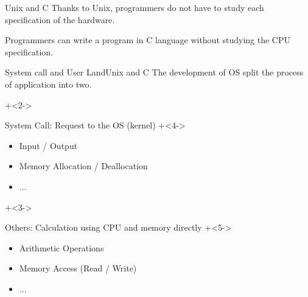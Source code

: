 \begin{frame}{Unix and C}{}
    Thanks to Unix, programmers do not have to study each specification of the hardware.
    \vspace{4ex}

    Programmers can write a program in C language without studying the CPU specification.
\end{frame}


\begin{frame}{System call and User Land}{Unix and C}
    The development of OS split the process of application into two.
    \vspace{2ex}

    \onslide+<2->{{\small
        System Call: Request to the OS (kernel)
        \onslide+<4->{{\footnotesize
            \begin{itemize}
                \item   Input / Output
                \item   Memory Allocation / Deallocation
                \item   ...
            \end{itemize}
        }}
    }}

    \onslide+<3->{{\small
        Others: Calculation using CPU and memory directly
        \onslide+<5->{{\footnotesize
            \begin{itemize}
                \item   Arithmetic Operations
                \item   Memory Access (Read / Write)
                \item   ...
            \end{itemize}
        }}
    }}
\end{frame}
